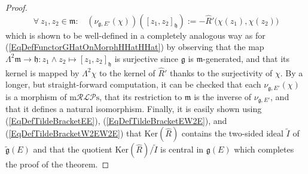 \documentclass [11pt] {article}
\theoremstyle{definition}
\begin{document}
\begin{proof}
	\[
	\forall~z_1,z_2\in 
	\mathfrak{m}:~~~~
	(\nu_{\mathfrak{g},E'}(\chi))\left([z_1,z_2]_\mathfrak{h}\right)
	    := -\hat{R}'\big(\chi(z_1),\chi(z_2)\big)
	\]
	which is shown to be well-defined in a completely analogous way as for 
	(\ref{EqDefFunctorGHatOnMorphHHatHHat}) by observing that the map
	$\Lambda^2\mathfrak{m}\to \mathfrak{h}:z_1\wedge z_2\mapsto [z_1,z_2]_\mathfrak{h}$ is surjective since $\mathfrak{g}$ is 
	$\mathfrak{m}$-generated, and that its kernel is mapped by $\Lambda^2\chi$
	to the kernel of $\hat{R}'$ thanks to the surjectivity of $\chi$. By a longer, but straight-forward computation, it can be checked that each $\nu_{\mathfrak{g},E'}(\chi)$ is a morphism of $\mathrm{m}\mathcal{RLP}\mathrm{s}$, that its restriction to $\mathfrak{m}$ is the inverse of $\nu_{\mathfrak{g},E'}$, and that it defines a natural isomorphism.
	Finally, it is easily shown using  (\ref{EqDefTildeBracketEE}),
	(\ref{EqDefTildeBracketEW2E}), and (\ref{EqDefTildeBracketW2EW2E}) that
	$\mathrm{Ker}(\hat{R})$ contains the two-sided ideal $\tilde{I}$ of
	$\tilde{\mathfrak{g}}(E)$ and that the quotient $\mathrm{Ker}(\hat{R})/
	\tilde{I}$ is central in $\mathfrak{g}(E)$ which completes the proof of the theorem.
\end{proof}
\end{document}
